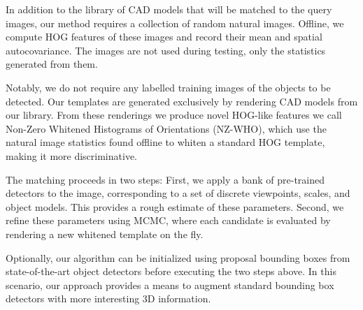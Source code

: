 \documentclass[10pt,twocolumn,letterpaper]{article}
\begin{document}
In addition to the library of CAD models that will be matched to the query images, our method requires a collection of random natural images. Offline, we compute HOG features of these images and record their mean and spatial autocovariance. The images are not used during testing, only the statistics generated from them.

Notably, we do not require any labelled training images of the objects to be detected. Our templates are generated exclusively by rendering CAD models from our library. From these renderings we produce novel HOG-like features we call Non-Zero Whitened Histograms of Orientations (NZ-WHO), which use the natural image statistics found offline to whiten a standard HOG template, making it more discriminative.

The matching proceeds in two steps: First, we apply a bank of pre-trained detectors to the image, corresponding to a set of discrete viewpoints, scales, and object models. This provides a rough estimate of these parameters. Second, we refine these parameters using MCMC, where each candidate is evaluated by rendering a new whitened template on the fly. 

Optionally, our algorithm can be initialized using proposal bounding boxes from state-of-the-art object detectors \cite{Felzenszwalb10,Girshick14} before executing the two steps above. In this scenario, our approach provides a means to augment standard bounding box detectors with more interesting 3D information.
\end{document}
